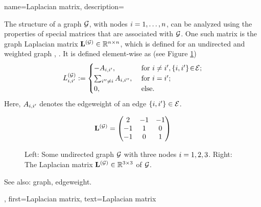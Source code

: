{name={Laplacian matrix},
	description={The structure of a \gls{graph} $\mathcal{G}$, with 
		nodes $i=1, \ldots, n$, can be analyzed using the properties of 
		special matrices that are associated with $\mathcal{G}$. One such matrix is the 
		\gls{graph} Laplacian matrix ${\bf L}^{(\mathcal{G})} \in \mathbb{R}^{n \times n}$, 
		which is defined for an undirected and weighted \gls{graph} \cite{Luxburg2007}, \cite{Ng2001}. 
		It is defined element-wise as (see Figure \ref{fig_lap_mtx_dict})
	\begin{equation}
		L^{(\mathcal{G})}_{i,i'} := \begin{cases} - A_{i,i'}, & \mbox{ for } i\neq i', \{i,i'\}\!\in\!\mathcal{E}; \\ 
			\sum_{i'' \neq i} A_{i,i''}, & \mbox{ for } i = i'; \\ 
							0, & \mbox{ else.} \end{cases}
	 \end{equation}
  		Here, $A_{i,i'}$ denotes the \gls{edgeweight} of an edge $\{i,i'\} \in \mathcal{E}$. 
  	\begin{figure}[H]
  	\begin{center}
   	\begin{minipage}{0.45\textwidth}
	 			 	\end{minipage} 
	 			 	\hspace*{-15mm}
 		 		\begin{minipage}{0.45\textwidth}
	 			 	 \begin{equation} 
	 				 		 {\bf L}^{(\mathcal{G})} = \begin{pmatrix} 2 & -1& -1 \\ -1& 1 & 0 \\  -1 & 0 & 1 \end{pmatrix}  
	 				 		 \nonumber
	 				 		 \end{equation} 
	 			 \end{minipage}
	 	 \caption{\label{fig_lap_mtx_dict} Left: Some undirected \gls{graph} $\mathcal{G}$ with three nodes $i=1,2,3$. 
	 		 	Right: The Laplacian matrix ${\bf L}^{(\mathcal{G})}  \in \mathbb{R}^{3 \times 3}$ of $\mathcal{G}$.} 
	 		 	\end{center}
	 \end{figure}
		See also: \gls{graph}, \gls{edgeweight}.},
	first={Laplacian matrix},
	text={Laplacian matrix}
}

